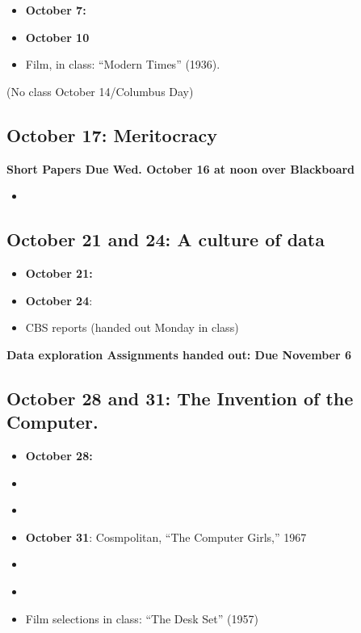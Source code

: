 \begin{itemize}
\item
  \textbf{October 7:} \cite{taylor_principles_2006}
\item
  \textbf{October 10} \cite[Chapters 5 and 6]{meyer_five_1981}
\item
  Film, in class: ``Modern Times'' (1936).
\end{itemize}

(No class October 14/Columbus Day)

\subsection{October 17: Meritocracy}\label{october-17-meritocracy}

\textbf{Short Papers Due Wed. October 16 at noon over Blackboard}

\begin{itemize}
\itemsep1pt\parskip0pt
\item
  \cite[pp. 1-173]{lemann_big_1999}
\end{itemize}

\subsection{October 21 and 24: A culture of
data}\label{october-21-and-24-a-culture-of-data}

\begin{itemize}
\item
  \textbf{October 21:}
  \cite[Introduction, Chapters 5 and 6, and Epilogue]{igo_averaged_2007}
\item
  \textbf{October 24}: \cite[pp 193-229]{ohmer_george_2006}
\item
  CBS reports (handed out Monday in class)
\end{itemize}

\textbf{Data exploration Assignments handed out: Due November 6}

\subsection{October 28 and 31: The Invention of the
Computer.}\label{october-28-and-31-the-invention-of-the-computer.}

\begin{itemize}
\item
  \textbf{October 28:} \cite{edwards_why_1996}
\item
  \cite{bush_as_1945}
\item
  \cite{bush_memex_1991}
\item
  \textbf{October 31}: Cosmpolitan, ``The Computer Girls,'' 1967
\item
  \cite[Chapter TBD]{ensmenger_computer_2010}
\item
  \cite{light_when_1999}
\item
  Film selections in class: ``The Desk Set'' (1957)
\end{itemize}

